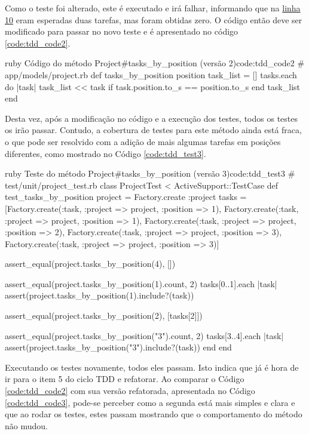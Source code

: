 Como o teste foi alterado, este é executado e irá falhar, informando que na \hyperref[code:tdd_test2]{linha 10} eram esperadas duas tarefas, mas foram obtidas zero. O código então deve ser modificado para passar no novo teste e é apresentado no código \ref{code:tdd_code2}.

\begin{mycode}{ruby}%
{Código do método Project\#tasks\_by\_position (versão 2)}{code:tdd_code2}
# app/models/project.rb
def tasks_by_position position
  task_list = []
  tasks.each do |task|
    task_list << task if task.position.to_s == position.to_s
  end
  task_list
end
\end{mycode}

Desta vez, após a modificação no código e a execução dos testes, todos os testes os irão passar. Contudo, a cobertura de testes para este método ainda está fraca, o que pode ser resolvido com a adição de mais algumas tarefas em posições diferentes, como mostrado no Código \ref{code:tdd_test3}.

\begin{mycode}{ruby}%
{Teste do método Project\#tasks\_by\_position (versão 3)}{code:tdd_test3}
# test/unit/project_test.rb
class ProjectTest < ActiveSupport::TestCase
  def test_tasks_by_position
    project = Factory.create :project
    tasks = [Factory.create(:task, :project => project, :position => 1),
             Factory.create(:task, :project => project, :position => 1),
             Factory.create(:task, :project => project, :position => 2),
             Factory.create(:task, :project => project, :position => 3),
             Factory.create(:task, :project => project, :position => 3)]

    assert_equal(project.tasks_by_position(4), [])

    assert_equal(project.tasks_by_position(1).count, 2)
    tasks[0..1].each { |task| assert(project.tasks_by_position(1).include?(task)) }

    assert_equal(project.tasks_by_position(2), [tasks[2]])

    assert_equal(project.tasks_by_position("3").count, 2)
    tasks[3..4].each { |task| assert(project.tasks_by_position("3").include?(task)) }
  end
end
\end{mycode}

Executando os testes novamente, todos eles passam. Isto indica que já é hora de ir para o item 5 do ciclo TDD e refatorar. Ao comparar o Código \ref{code:tdd_code2} com sua versão refatorada, apresentada no Código \ref{code:tdd_code3}, pode-se perceber como a segunda está mais simples e clara e que ao rodar os testes, estes passam mostrando que o comportamento do método não mudou.

